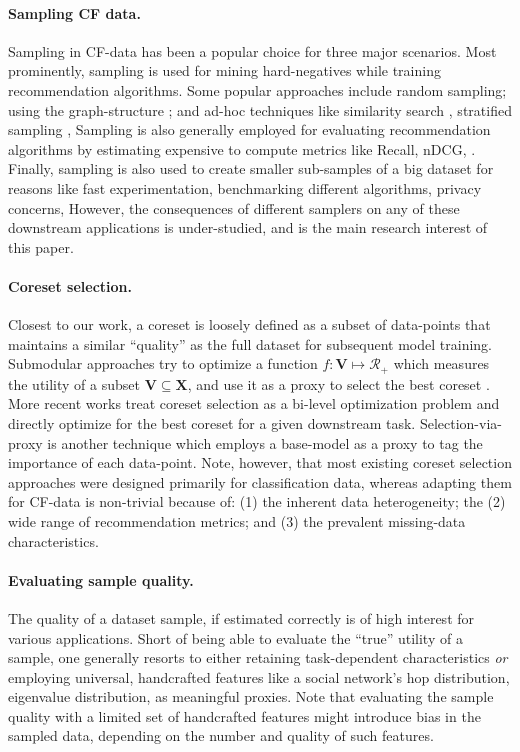 \paragraph{Sampling CF data.} Sampling in CF-data has been a popular choice for three major scenarios. Most prominently, sampling is used for mining hard-negatives while training recommendation algorithms. Some popular approaches include random sampling; using the graph-structure %
\cite{pinsage, eclare}; and ad-hoc techniques like similarity search \cite{slice}, stratified sampling \cite{sampling_cf_nn}, \etc %
Sampling is also generally employed for evaluating recommendation algorithms by estimating expensive to compute metrics like Recall, nDCG, \etc \cite{sampled_metrics, castells_sampling}. Finally, sampling is also used to create smaller sub-samples of 
a big dataset
for reasons like fast experimentation, benchmarking different algorithms, privacy concerns, \etc However, the consequences of different samplers on any of these downstream applications is under-studied, and is the main research interest of this paper. 

\paragraph{Coreset selection.} Closest to our work, a coreset is loosely defined as a subset of data-points that maintains a similar ``quality'' as the full dataset for subsequent model training. Submodular approaches try to optimize a function $f : \mathbf{V} \mapsto \mathcal{R}_+$ which measures the utility of a subset $\mathbf{V} \subseteq \mathbf{X}$, and use it as a proxy to select the best coreset \cite{coreset_1}. More recent works treat coreset selection as a bi-level optimization problem \cite{coreset_bilevel, coreset_bilevel_2} and directly optimize for the best coreset for a given downstream task. Selection-via-proxy \cite{svp} is another technique which employs a base-model as a proxy to tag the importance of each data-point. Note, however, that 
most existing
coreset selection approaches were designed primarily for classification data, whereas adapting them for CF-data is non-trivial because of: (1) the inherent data heterogeneity; the (2) wide range of recommendation metrics; and (3) the prevalent missing-data characteristics.

\paragraph{Evaluating sample quality.} The quality of a dataset sample, if estimated correctly is of high interest for various applications. Short of being able to evaluate the ``true'' utility of a sample, one generally resorts to either retaining task-dependent characteristics \cite{evaluate_sample_quality_1} \emph{or} employing universal, handcrafted features like a social network's hop distribution, eigenvalue distribution, \etc \cite{large_graphs} as meaningful proxies. Note that evaluating the sample quality with a limited set of handcrafted features might introduce bias in the sampled data, depending on the number and quality of such features.
